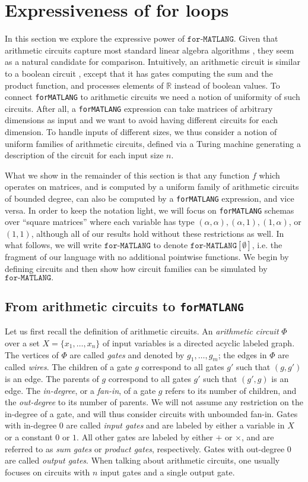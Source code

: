 \documentclass[sigconf]{acmart}
\newcommand{\RR}{\mathbb{R}}
\newcommand{\langfor}{\texttt{for}\text{-}\texttt{MATLANG}\xspace}
\newcommand{\langforf}[1]{\texttt{for}\text{-}\texttt{MATLANG}[#1]\xspace}
\begin{document}
\section{Expressiveness of for loops}\label{sec:circuits}
In this section we explore the expressive power of $\langfor.$ Given that arithmetic circuits \cite{allender} capture most standard linear algebra algorithms \cite{Raz02,ShpilkaY10}, they seem as a natural candidate for comparison. Intuitively, an arithmetic circuit is similar to a boolean circuit \cite{aroraB2009}, except that it has gates computing the sum and the product function, and processes elements of $\RR$ instead of boolean values. To connect \langfor to arithmetic circuits we need a notion of uniformity of such circuits. After all, a \langfor expression can take matrices of arbitrary dimensions as input and we want to avoid having  different circuits for each dimension. To handle inputs of different sizes, we thus consider a notion of uniform families of arithmetic circuits, defined via a Turing machine generating a description of the circuit for each input size $n$.

What we show in the remainder of this section is that any function $f$ which operates on matrices, and is computed by a uniform family of arithmetic circuits of bounded degree, can also be computed by a \langfor expression, and vice versa. In order to keep the notation light, we will focus on 
 \langfor schemas over ``square matrices'' where each variable has type $(\alpha,\alpha),(\alpha,1),(1,\alpha)$, or $(1,1)$, although all of our results hold without these restrictions as well. In what follows, we will write $\langfor$ to denote $\langforf{\emptyset}$, i.e. the fragment of our language with no additional pointwise functions. We begin by defining circuits and then show how circuit families can be simulated by $\langfor.$

\subsection{From arithmetic circuits to \langfor}
Let us first recall the definition of arithmetic circuits. 
An \textit{arithmetic circuit} $\Phi$ over a set $X=\{x_1,\ldots,x_n\}$ of input variables is a directed
acyclic labeled graph. The vertices of $\Phi$ are called \textit{gates} and denoted by $g_1,\ldots,g_m$;
the edges in $\Phi$ are called \textit{wires}. The children of a gate $g$ correspond to all gates
$g'$ such that $(g,g')$ is an edge. The parents of $g$ correspond to all gates $g'$ 
such that $(g',g)$ is an edge. The \textit{in-degree}, or a \textit{fan-in}, of a gate $g$ refers to its number of children, and 
the \textit{out-degree} to its number of parents. We will not assume any restriction on the in-degree of a gate, and will thus consider circuits with unbounded fan-in. Gates with in-degree $0$ are called \textit{input gates}
and are labeled by either a variable in $X$ or a constant $0$ or $1$. All other gates
are labeled by either $+$ or $\times$, and are referred to as \textit{sum gates} or \textit{product gates}, respectively.
Gates with out-degree $0$ are called \textit{output gates}. When talking about arithmetic circuits, one usually focuses on circuits with $n$ input gates and a single output gate.
\end{document}
